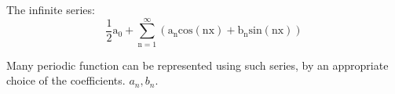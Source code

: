 The infinite series:
\[ \frac{1}{2} \mathrm{a}_0 +
\sum _{\mathrm{n}=1} ^{\infty} 
( \mathrm{a}_{\mathrm{n}} \mathrm{cos(nx)}
+ \mathrm{b}_{\mathrm{n}} \mathrm{sin(nx)} )
\]
\par
Many periodic function can be represented using such series,
by an appropriate choice of the coefficients. $a_{n}, b_{n}.$ 